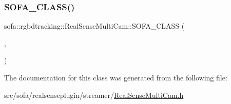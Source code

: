 \mbox{\label{classsofa_1_1rgbdtracking_1_1_real_sense_multi_cam_a580a759696c9de476a75c1aabc955669}} 
\subsubsection{\texorpdfstring{S\+O\+F\+A\+\_\+\+C\+L\+A\+S\+S()}{SOFA\_CLASS()}}
{\footnotesize\ttfamily sofa\+::rgbdtracking\+::\+Real\+Sense\+Multi\+Cam\+::\+S\+O\+F\+A\+\_\+\+C\+L\+A\+SS (\begin{DoxyParamCaption}\item[{\hyperlink{classsofa_1_1rgbdtracking_1_1_real_sense_multi_cam}{Real\+Sense\+Multi\+Cam}}]{,  }\item[{\hyperlink{classsofa_1_1rgbdtracking_1_1_real_sense_multi_cam_ac46918355916b1af92c7aabc7e244e39}{Inherited}}]{ }\end{DoxyParamCaption})}



The documentation for this class was generated from the following file\+:\begin{DoxyCompactItemize}
\item 
src/sofa/realsenseplugin/streamer/\hyperlink{_real_sense_multi_cam_8h}{Real\+Sense\+Multi\+Cam.\+h}\end{DoxyCompactItemize}
